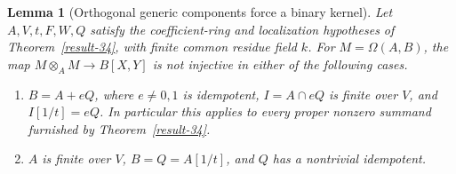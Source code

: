 \documentclass[11pt,a4paper]{article}
\newtheorem{lemma}[theorem]{Lemma}
\theoremstyle{definition}
\begin{document}
\begin{lemma}[Orthogonal generic components force a binary kernel]\label{result-46}
Let $A,V,t,F,W,Q$ satisfy the coefficient-ring and localization
hypotheses of Theorem~\ref{result-34}, with finite common residue
field $k$. For $M=\Omega(A,B)$, the map
$M\otimes_A M\to B[X,Y]$ is not injective in either of the following
cases.
\begin{enumerate}[label=(\alph*)]
\item $B=A+eQ$, where $e\ne0,1$ is idempotent,
$I=A\cap eQ$ is finite over $V$, and $I[1/t]=eQ$.
In particular this applies to every proper nonzero summand
furnished by Theorem~\ref{result-34}.
\item $A$ is finite over $V$, $B=Q=A[1/t]$, and $Q$ has a
nontrivial idempotent.
\end{enumerate}
\end{lemma}
\end{document}
